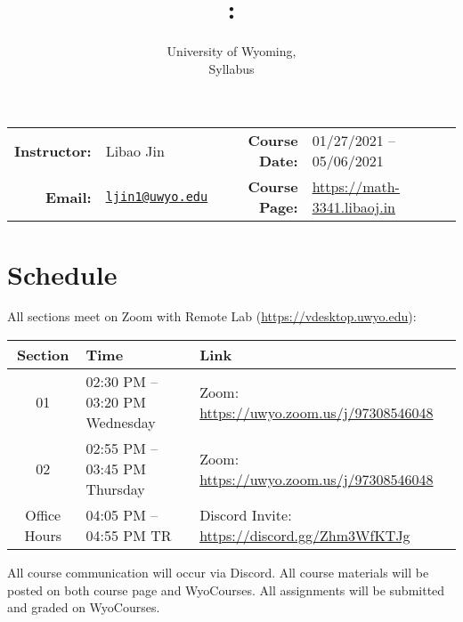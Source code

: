 \documentclass[11pt, letterpaper]{article}
\title{\vspace{-2ex}\courseNum: \courseTitle \vspace{-2ex}}
\author{University of Wyoming, \semester \\ Syllabus \vspace{-2ex}}
\date{}
\begin{document}
\thispagestyle{plain}
\maketitle

\begin{table}[!htbp]
  \begin{tabular}{rlrl}
    \textbf{Instructor:} & Libao Jin & \textbf{Course Date:} & 01/27/2021 -- 05/06/2021 \\
    \textbf{Email:} & \href{mailto:ljin1@uwyo.edu?subject=[MATH-3341]}{\texttt{ljin1@uwyo.edu}} \hspace{5pt} & \textbf{Course Page:} & \url{https://math-3341.libaoj.in} \\
  \end{tabular}
\end{table}

\section*{Schedule}
All sections meet on Zoom with Remote Lab (\url{https://vdesktop.uwyo.edu}):
\begin{table}[!hbtp]
  \centering
  \begin{tabular}{cll}
    Section & Time & Link \\
    \midrule
    01 & 02:30 PM -- 03:20 PM Wednesday & Zoom: \url{https://uwyo.zoom.us/j/97308546048} \\
    02 & 02:55 PM -- 03:45 PM Thursday & Zoom: \url{https://uwyo.zoom.us/j/97308546048}  \\
    Office Hours &  04:05 PM -- 04:55 PM TR & Discord Invite: \url{https://discord.gg/Zhm3WfKTJg} \\
  \end{tabular}
\end{table}

All course communication will occur via Discord. All course materials will be posted on both course page and WyoCourses. All assignments will be submitted and graded on WyoCourses.

\end{document}
